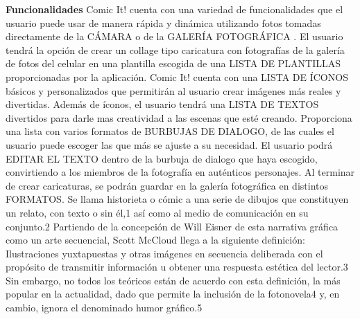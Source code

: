 \documentclass[12pt]{report}
\begin{document}
	\begingroup
		\large{
			\textbf{
				Funcionalidades
				\newline
				\newline
			}
		}
	\endgroup
\newline
Comic It! cuenta con una variedad de funcionalidades que el usuario puede usar de manera rápida y dinámica utilizando 				fotos tomadas directamente de la CÁMARA o de la GALERÍA FOTOGRÁFICA .
El usuario tendrá la opción de crear un collage tipo caricatura  con fotografías de la galería de fotos del celular en una plantilla escogida de una LISTA DE PLANTILLAS proporcionadas por la aplicación.
Comic It! cuenta con una LISTA DE ÍCONOS básicos y personalizados que permitirán al usuario crear imágenes más reales y divertidas.		
Además de íconos, el usuario tendrá una LISTA DE TEXTOS divertidos para darle mas creatividad a las escenas que esté creando.
Proporciona una lista con varios formatos de BURBUJAS DE DIALOGO, de las cuales el usuario puede escoger las que más se ajuste a su necesidad. El usuario podrá EDITAR EL TEXTO dentro de la burbuja de dialogo que haya escogido, convirtiendo a los miembros de 		la fotografía en auténticos personajes.
Al terminar de crear caricaturas, se podrán guardar en la galería fotográfica en distintos FORMATOS.
\newline
\newline
Se llama historieta o cómic a una serie de dibujos que constituyen un relato, con texto o sin él,1 así como al medio de comunicación en su conjunto.2 Partiendo de la concepción de Will Eisner de esta narrativa gráfica como un arte secuencial, Scott McCloud llega a la siguiente definición: Ilustraciones yuxtapuestas y otras imágenes en secuencia deliberada con el propósito de transmitir información u obtener una respuesta estética del lector.3 Sin embargo, no todos los teóricos están de acuerdo con esta definición, la más popular en la actualidad, dado que permite la inclusión de la fotonovela4 y, en cambio, ignora el denominado humor gráfico.5
\newline
	\newline
	\newline
	\newline
\end{document}
